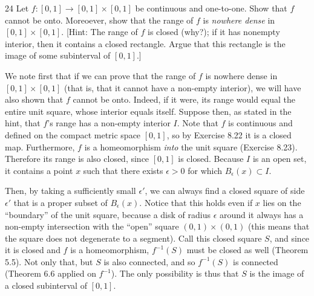 \newpage

\begin{exercise}{24}
    Let $f: [0, 1] \rightarrow [0, 1] \times [0, 1]$ be continuous and one-to-one.
    Show that $f$ cannot be onto.
    Moreoever, show that the range of $f$ is \textit{nowhere dense} in $[0, 1] \times [0, 1]$.
    [Hint: The range of $f$ is closed (why?); if it has nonempty interior, then it contains a closed rectangle.
    Argue that this rectangle is the image of some subinterval of $[0, 1]$.]
\end{exercise}

\begin{solution}
    
    We note first that if we can prove that the range of $f$ is nowhere dense in $[0, 1] \times [0, 1]$ (that is, that it cannot have a non-empty interior), we will have also shown that $f$ cannot be onto.
    Indeed, if it were, its range would equal the entire unit square, whose interior equals itself.
    Suppose then, as stated in the hint, that $f$'s range has a non-empty interior $I$.
    Note that $f$ is continuous and defined on the compact metric space $[0, 1]$, so by Exercise 8.22 it is a closed map.
    Furthermore, $f$ is a homeomorphism \textit{into} the unit square (Exercise 8.23).
    Therefore its range is also closed, since $[0, 1]$ is closed.
    Because $I$ is an open set, it contains a point $x$ such that there exists $\epsilon > 0$ for which $B_{\epsilon}(x) \subset I$.

    Then, by taking a sufficiently small $\epsilon'$, we can always find a closed square of side $\epsilon'$ that is a proper subset of $B_{\epsilon}(x)$.
    Notice that this holds even if $x$ lies on the ``boundary'' of the unit square, because a disk of radius $\epsilon$ around it always has a non-empty intersection with the ``open'' square $(0, 1) \times (0, 1)$ (this means that the square does not degenerate to a segment).
    Call this closed square $S$, and since it is closed and $f$ is a homeomorphism, $f^{-1}(S)$ must be closed as well (Theorem 5.5).
    Not only that, but $S$ is also connected, and so $f^{-1}(S)$ is connected (Theorem 6.6 applied on $f^{-1}$).
    The only possibility is thus that $S$ is the image of a closed subinterval of $[0, 1]$.


\end{solution}
